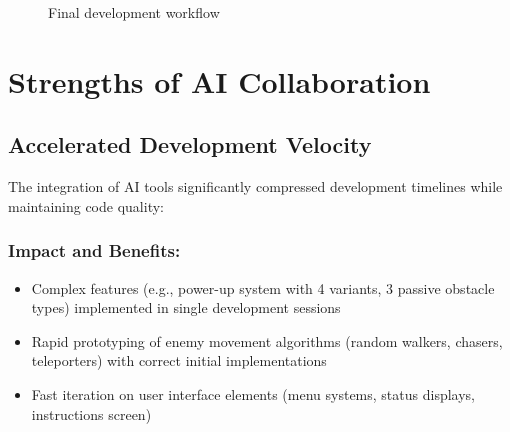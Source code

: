 \documentclass[12pt,a4paper]{article}
\begin{document}
\begin{figure}[ht]
\centering
{}
\caption{Final development workflow}
\end{figure}

\newpage

\section{Strengths of AI Collaboration}

\subsection{Accelerated Development Velocity}

The integration of AI tools significantly compressed development timelines while maintaining code quality:

\subsubsection*{Impact and Benefits:}
\begin{itemize}
    \item Complex features (e.g., power-up system with 4 variants, 3 passive obstacle types) implemented in single development sessions
    \item Rapid prototyping of enemy movement algorithms (random walkers, chasers, teleporters) with correct initial implementations
    \item Fast iteration on user interface elements (menu systems, status displays, instructions screen)
\end{itemize}
\end{document}
